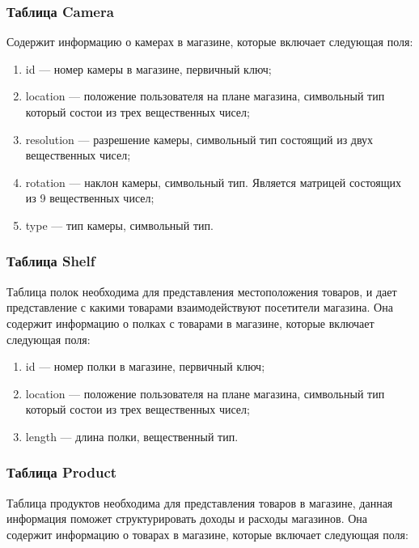 \subsubsection{\large Таблица Camera}

Содержит информацию о камерах в магазине, которые включает следующая поля:

\begin{enumerate}[label=\arabic*.]
    \item id --- номер камеры в магазине, первичный ключ;
    \item location --- положение пользователя на плане магазина, символьный тип 
    который состои из трех вещественных чисел;
    \item resolution --- разрешение камеры, символьный тип состоящий из двух
    вещественных чисел;
    \item rotation --- наклон камеры, символьный тип. Является матрицей
    состоящих из 9 вещественных чисел;
    \item type --- тип камеры, символьный тип.
\end{enumerate}

\subsubsection{Таблица Shelf}

Таблица полок необходима для представления местоположения товаров, и дает представление с какими товарами взаимодействуют посетители магазина. Она содержит информацию о полках с товарами в магазине, которые включает следующая поля:

\begin{enumerate}[label=\arabic*.]
    \item id --- номер полки в магазине, первичный ключ;
    \item location --- положение пользователя на плане магазина, символьный тип 
    который состои из трех вещественных чисел;
    \item length --- длина полки, вещественный тип.
\end{enumerate}

\subsubsection{Таблица Product}

Таблица продуктов необходима для представления товаров в магазине, данная информация поможет структурировать доходы и расходы магазинов.
Она содержит информацию о товарах в магазине, которые включает следующая поля:

